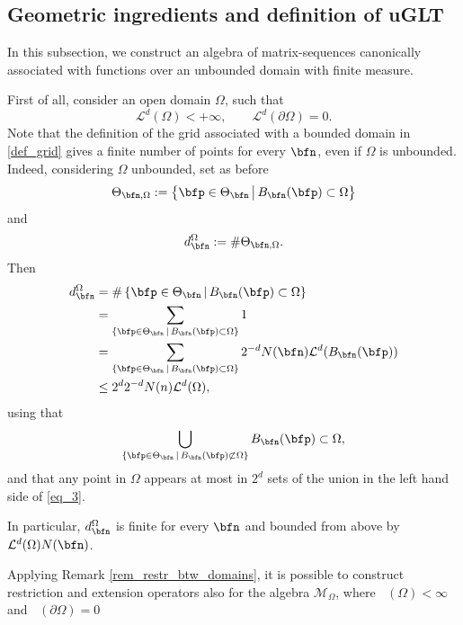 \documentclass{amsart}
\DeclareMathOperator{\Ld}{\mathcal{L}^d}
\begin{document}
\subsection{Geometric ingredients and definition of uGLT}

In this subsection, we construct an algebra of matrix-sequences canonically associated with functions over an unbounded domain with finite measure.

First of all, consider an open domain $\Omega$, such that 
\begin{equation*}
    \mathcal{L}^d(\Omega)<+\infty,\qquad\mathcal{L}^d(\partial\Omega)=0.
\end{equation*}
Note that the definition of the grid associated with a bounded domain in \eqref{def_grid} gives a finite number of points for every $\bfn$, even if $\Omega$ is unbounded.
Indeed, considering $\Omega$ unbounded, set as before
\begin{equation*}    
\Theta_{\bfn,\Omega}:=\left\{\bfp\in\Theta_{\bfn}\,\big|\, B_{\bfn}(\bfp)\subset\Omega\right\}
\end{equation*}
and 
\begin{equation*}
    d_{\bfn}^{\Omega}:=\#\Theta_{\bfn,\Omega}.
\end{equation*}
Then 
\begin{align*}
    d_{\bfn}^{\Omega}&=\#\left\{\bfp\in\Theta_\bfn\,\vert\, B_\bfn(\bfp)\subset\Omega\right\}\\
        &=\sum\limits_{\{\bfp\in\Theta_\bfn\,\vert\, B_\bfn(\bfp)\subset\Omega\}}1\\
        &=\sum\limits_{\{\bfp\in\Theta_\bfn\,\vert\, B_\bfn(\bfp)\subset\Omega\}}2^{-d}N(\bfn)\mathcal{L}^d(B_{\bfn}(\bfp))\\
        &\leq2^d2^{-d}N(n)\mathcal{L}^d(\Omega),
\end{align*}
using that 
\begin{equation}\label{eq_3}
    \bigcup\limits_{\{\bfp\in\Theta_\bfn\,\vert\, B_\bfn(\bfp)\not\subset\Omega\}}B_\bfn(\bfp)\subset\Omega,
\end{equation}
and that any point in $\Omega$ appears at most in $2^d$ sets of the union in the left hand side of \eqref{eq_3}.

In particular, $d_{\bfn}^{\Omega}$ is finite for every $\bfn$ and bounded from above by $\mathcal{L}^d(\Omega)N(\bfn)$.

Applying Remark \ref{rem_restr_btw_domains}, it is possible to construct restriction and extension operators also for the algebra $\mathcal{M}_\Omega$, where $\Ld(\Omega)<\infty$ and $\Ld(\partial\Omega)=0$
\end{document}
